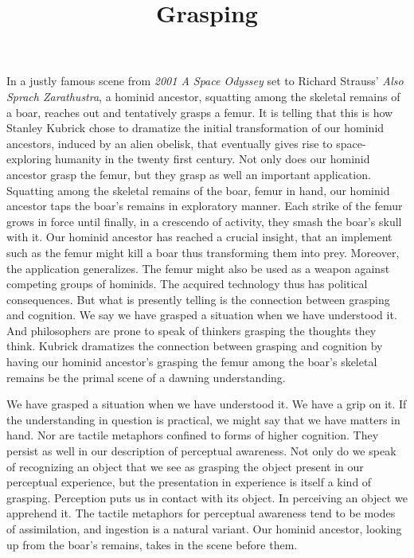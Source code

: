 \documentclass[12pt]{article}
\title{Grasping}
\author{\myauthor}
\date{} %
\begin{document}
\maketitle

\setlength{\parindent}{1em}



In a justly famous scene from \emph{2001 A Space Odyssey} set to Richard Strauss' \emph{Also Sprach Zarathustra}, a hominid ancestor, squatting among the skeletal remains of a boar, reaches out and tentatively grasps a femur. It is telling that this is how Stanley Kubrick chose to dramatize the initial transformation of our hominid ancestors, induced by an alien obelisk, that eventually gives rise to space-exploring humanity in the twenty first century. Not only does our hominid ancestor grasp the femur, but they grasp as well an important application. Squatting among the skeletal remains of the boar, femur in hand, our hominid ancestor taps the boar's remains in exploratory manner. Each strike of the femur grows in force until finally, in a crescendo of activity, they smash the boar's skull with it. Our hominid ancestor has reached a crucial insight, that an implement such as the femur might kill a boar thus transforming them into prey. Moreover, the application generalizes. The femur might also be used as a weapon against competing groups of hominids. The acquired technology thus has political consequences. But what is presently telling is the connection between grasping and cognition. We say we have grasped a situation when we have understood it. And philosophers are prone to speak of thinkers grasping the thoughts they think. Kubrick dramatizes the connection between grasping and cognition by having our hominid ancestor's grasping the femur among the boar's skeletal remains be the primal scene of a dawning understanding.

We have grasped a situation when we have understood it. We have a grip on it. If the understanding in question is practical, we might say that we have matters in hand. Nor are tactile metaphors confined to forms of higher cognition. They persist as well in our description of perceptual awareness. Not only do we speak of recognizing an object that we see as grasping the object present in our perceptual experience, but the presentation in experience is itself a kind of grasping. Perception puts us in contact with its object. In perceiving an object we apprehend it. The tactile metaphors for perceptual awareness tend to be modes of assimilation, and ingestion is a natural variant. Our hominid ancestor, looking up from the boar's remains, takes in the scene before them.
\end{document}
